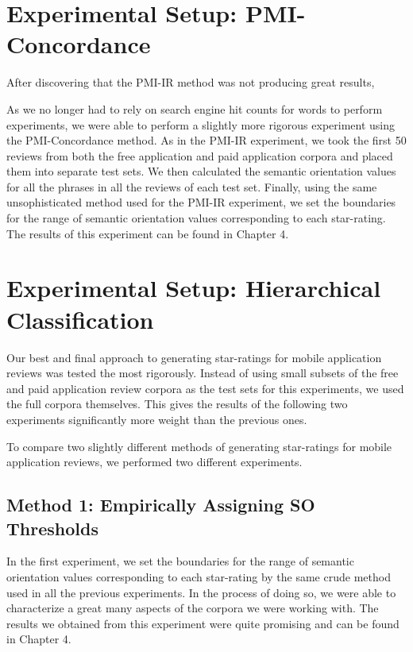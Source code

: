 \documentclass[11pt]{report} %
\begin{document}
\section{Experimental Setup: PMI-Concordance}

After discovering that the PMI-IR method was not producing great results, 

As we no longer had to rely on search engine hit counts for words to perform experiments, we were able to perform a slightly more rigorous experiment using the PMI-Concordance method. As in the PMI-IR experiment, we took the first 50 reviews from both the free application and paid application corpora and placed them into separate test sets. We then calculated the semantic orientation values for all the phrases in all the reviews of each test set. Finally, using the same unsophisticated method used for the PMI-IR experiment, we set the boundaries for the range of semantic orientation values corresponding to each star-rating. The results of this experiment can be found in Chapter 4. 

\section{Experimental Setup: Hierarchical Classification}

Our best and final approach to generating star-ratings for mobile application reviews was tested the most rigorously. Instead of using small subsets of the free and paid application review corpora as the test sets for this experiments, we used the full corpora themselves. This gives the results of the following two experiments significantly more weight than the previous ones.

To compare two slightly different methods of generating star-ratings for mobile application reviews, we performed two different experiments.

	\subsection{Method 1: Empirically Assigning SO Thresholds}

In the first experiment, we set the boundaries for the range of semantic orientation values corresponding to each star-rating by the same crude method used in all the previous experiments. In the process of doing so, we were able to characterize a great many aspects of the corpora we were working with. The results we obtained from this experiment were quite promising and can be found in Chapter 4.
\end{document}
